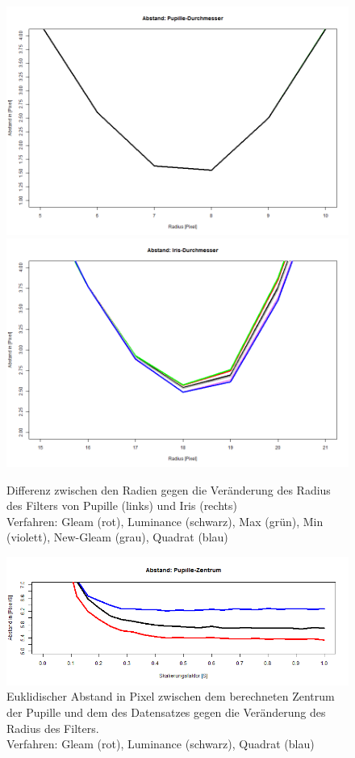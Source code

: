 \begin{figure}
	\centering
	\includegraphics[width=0.49\linewidth]{Eye_Img_Box/Vergleich_P}
	\includegraphics[width=0.49\linewidth]{Eye_Img_Box/Vergleich_I}
	\caption{Differenz zwischen den Radien gegen die Veränderung des Radius des Filters von Pupille (links) und Iris (rechts)\\
	Verfahren: Gleam (rot), Luminance (schwarz), Max (grün), Min (violett), New-Gleam (grau), Quadrat (blau)}
	\label{img_vergleich_PI}
\end{figure}
\begin{figure}
	\centering
	\includegraphics[width=\linewidth]{Eye_Img_Box/Vergleich_Scal_A}
	\caption{Euklidischer Abstand in Pixel zwischen dem berechneten Zentrum der Pupille und dem des Datensatzes gegen die Veränderung des Radius des Filters.\\
		Verfahren: Gleam (rot), Luminance (schwarz),  Quadrat (blau)}
	\label{img_Vergleich_Scal_A}
\end{figure}
